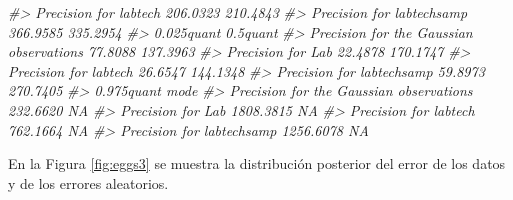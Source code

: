 \documentclass[
]{book}
\newenvironment{Shaded}{\begin{snugshade}}{\end{snugshade}}
\newcommand{\AttributeTok}[1]{\textcolor[rgb]{0.77,0.63,0.00}{#1}}
\newcommand{\CommentTok}[1]{\textcolor[rgb]{0.56,0.35,0.01}{\textit{#1}}}
\newcommand{\ConstantTok}[1]{\textcolor[rgb]{0.00,0.00,0.00}{#1}}
\newcommand{\ControlFlowTok}[1]{\textcolor[rgb]{0.13,0.29,0.53}{\textbf{#1}}}
\newcommand{\DecValTok}[1]{\textcolor[rgb]{0.00,0.00,0.81}{#1}}
\newcommand{\FunctionTok}[1]{\textcolor[rgb]{0.00,0.00,0.00}{#1}}
\newcommand{\NormalTok}[1]{#1}
\newcommand{\OtherTok}[1]{\textcolor[rgb]{0.56,0.35,0.01}{#1}}
\newcommand{\SpecialCharTok}[1]{\textcolor[rgb]{0.00,0.00,0.00}{#1}}
\newcommand{\StringTok}[1]{\textcolor[rgb]{0.31,0.60,0.02}{#1}}
\begin{document}
\begin{Shaded}
\begin{Highlighting}[]
\CommentTok{\#\textgreater{} Precision for labtech                   206.0323 210.4843}
\CommentTok{\#\textgreater{} Precision for labtechsamp               366.9585 335.2954}
\CommentTok{\#\textgreater{}                                         0.025quant 0.5quant}
\CommentTok{\#\textgreater{} Precision for the Gaussian observations    77.8088 137.3963}
\CommentTok{\#\textgreater{} Precision for Lab                          22.4878 170.1747}
\CommentTok{\#\textgreater{} Precision for labtech                      26.6547 144.1348}
\CommentTok{\#\textgreater{} Precision for labtechsamp                  59.8973 270.7405}
\CommentTok{\#\textgreater{}                                         0.975quant mode}
\CommentTok{\#\textgreater{} Precision for the Gaussian observations   232.6620   NA}
\CommentTok{\#\textgreater{} Precision for Lab                        1808.3815   NA}
\CommentTok{\#\textgreater{} Precision for labtech                     762.1664   NA}
\CommentTok{\#\textgreater{} Precision for labtechsamp                1256.6078   NA}
\end{Highlighting}
\end{Shaded}

En la Figura \ref{fig:eggs3} se muestra la distribución posterior del error de los datos y de los errores aleatorios.

\begin{Shaded}
\end{Shaded}
\end{document}

